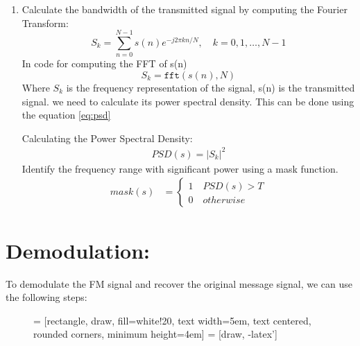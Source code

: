 \documentclass[journal,5pt,twocolumn]{IEEEtran}
\begin{document}
\begin{enumerate}
\item Calculate the bandwidth of the transmitted signal by computing the Fourier Transform:
\begin{equation}
S_k = \sum_{n=0}^{N-1} s(n) e^{-j2\pi kn/N}, \quad k=0,1,\dots,N-1
\end{equation}
In code for computing the FFT of s(n)
\begin{equation}
S_k = \texttt{fft}(s(n), N)
\end{equation}
Where $S_k$ is the frequency representation of the signal, s(n) is the transmitted signal. 
we need to calculate its power spectral density. This can be done using the equation \eqref{eq:psd}

Calculating the Power Spectral Density: 
\begin{align}
PSD(s)=\lvert S_k \rvert^2 
\label{eq:psd}
\end{align}
Identify the frequency range with significant power using a mask function. 
\begin{align*}
mask(s) &=
\begin{cases}
 1 \quad PSD(s) > T\\
0 \quad otherwise
\end{cases}
\end{align*}


\end{enumerate}
\section{\textbf{Demodulation:}}
To demodulate the FM signal and recover the original message signal, we can use the following steps:\\
\begin{figure}
 = [rectangle, draw, fill=white!20, text width=5em, text centered, rounded corners, minimum height=4em]
 = [draw, -latex']
\hspace{-1cm}
\label{fig:rx_blk}
\end{figure}
\end{document}
